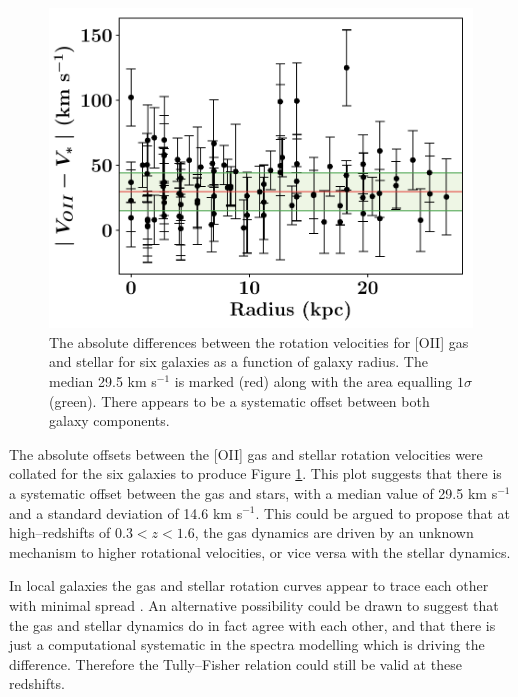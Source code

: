 \documentclass[12pt, twocolumn, nofootinbib]{revtex4-1}    %
\begin{document}
\begin{figure}
\includegraphics[width=1.0\linewidth]{data/deltav_vs_radius.pdf}
\caption{The absolute differences between the rotation velocities for [OII] gas and stellar for six galaxies as a function of galaxy radius. The median 29.5 km s$^{-1}$ is marked (red) along with the area equalling $1\sigma$ (green). There appears to be a systematic offset between both galaxy components.}
\label{fig:rotation_velocity_differences}
\end{figure} 

The absolute offsets between the [OII] gas and stellar rotation velocities were collated for the six galaxies to produce Figure \ref{fig:rotation_velocity_differences}. This plot suggests that there is a systematic offset between the gas and stars, with a median value of 29.5 km s$^{-1}$ and a standard deviation of 14.6 km s$^{-1}$. This could be argued to propose that at high--redshifts of $0.3<z<1.6$, the gas dynamics are driven by an unknown mechanism to higher rotational velocities, or vice versa with the stellar dynamics. 

In local galaxies the gas and stellar rotation curves appear to trace each other with minimal spread \citep{2004A&A...424..447P}. An alternative possibility could be drawn to suggest that the gas and stellar dynamics do in fact agree with each other, and that there is just a computational systematic in the spectra modelling which is driving the difference. Therefore the Tully--Fisher relation could still be valid at these redshifts.

\vspace{2ex} %
\end{document}
